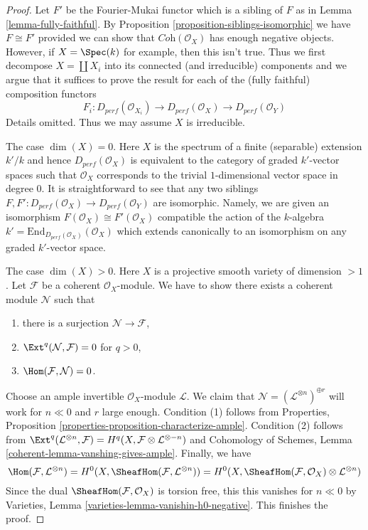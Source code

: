 \begin{proof}
Let $F'$ be the Fourier-Mukai functor which is a sibling of $F$
as in Lemma \ref{lemma-fully-faithful}.
By Proposition \ref{proposition-siblings-isomorphic} we have $F \cong F'$
provided we can show that $\textit{Coh}(\mathcal{O}_X)$ has enough
negative objects. However, if $X = \Spec(k)$ for example, then
this isn't true. Thus we first decompose $X = \coprod X_i$
into its connected (and irreducible) components and we
argue that it suffices to prove the result for each of the
(fully faithful) composition functors
$$
F_i :
D_{perf}(\mathcal{O}_{X_i}) \to
D_{perf}(\mathcal{O}_X) \to
D_{perf}(\mathcal{O}_Y)
$$
Details omitted. Thus we may assume $X$ is irreducible.

\medskip\noindent
The case $\dim(X) = 0$. Here $X$ is the spectrum of a finite (separable)
extension $k'/k$ and hence $D_{perf}(\mathcal{O}_X)$
is equivalent to the category
of graded $k'$-vector spaces such that $\mathcal{O}_X$ corresponds to the
trivial $1$-dimensional vector space in degree $0$.
It is straightforward to see that any two
siblings $F, F' : D_{perf}(\mathcal{O}_X) \to D_{perf}(\mathcal{O}_Y)$
are isomorphic. Namely, we are given an isomorphism
$F(\mathcal{O}_X) \cong F'(\mathcal{O}_X)$
compatible the action of the $k$-algebra
$k' = \text{End}_{D_{perf}(\mathcal{O}_X)}(\mathcal{O}_X)$
which extends canonically to an isomorphism on any graded $k'$-vector space.

\medskip\noindent
The case $\dim(X) > 0$. Here $X$ is a projective smooth
variety of dimension $> 1$. Let $\mathcal{F}$ be a coherent
$\mathcal{O}_X$-module. We have to show there exists a
coherent module $\mathcal{N}$ such that
\begin{enumerate}
\item there is a surjection $\mathcal{N} \to \mathcal{F}$,
\item $\Ext^q(\mathcal{N}, \mathcal{F}) = 0$ for $q > 0$,
\item $\Hom(\mathcal{F}, \mathcal{N}) = 0$.
\end{enumerate}
Choose an ample invertible $\mathcal{O}_X$-module $\mathcal{L}$.
We claim that $\mathcal{N} = (\mathcal{L}^{\otimes n})^{\oplus r}$
will work for $n \ll 0$ and $r$ large enough.
Condition (1) follows from
Properties, Proposition \ref{properties-proposition-characterize-ample}.
Condition (2) follows from
$\Ext^q(\mathcal{L}^{\otimes n}, \mathcal{F}) =
H^q(X, \mathcal{F} \otimes \mathcal{L}^{\otimes -n})$ and
Cohomology of Schemes, Lemma \ref{coherent-lemma-vanshing-gives-ample}.
Finally, we have
$$
\Hom(\mathcal{F}, \mathcal{L}^{\otimes n}) =
H^0(X, \SheafHom(\mathcal{F}, \mathcal{L}^{\otimes n})) =
H^0(X, \SheafHom(\mathcal{F}, \mathcal{O}_X) \otimes \mathcal{L}^{\otimes n})
$$
Since the dual $\SheafHom(\mathcal{F}, \mathcal{O}_X)$ is torsion free, this
this vanishes for $n \ll 0$ by Varieties, Lemma 
\ref{varieties-lemma-vanishin-h0-negative}. This finishes the proof.
\end{proof}

